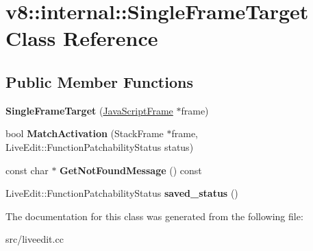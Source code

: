 \hypertarget{classv8_1_1internal_1_1_single_frame_target}{}\section{v8\+:\+:internal\+:\+:Single\+Frame\+Target Class Reference}
\label{classv8_1_1internal_1_1_single_frame_target}
\subsection*{Public Member Functions}
\begin{DoxyCompactItemize}
\item 
\hypertarget{classv8_1_1internal_1_1_single_frame_target_a00d5b78ddee5f1672be046372657766c}{}{\bfseries Single\+Frame\+Target} (\hyperlink{classv8_1_1internal_1_1_java_script_frame}{Java\+Script\+Frame} $\ast$frame)\label{classv8_1_1internal_1_1_single_frame_target_a00d5b78ddee5f1672be046372657766c}

\item 
\hypertarget{classv8_1_1internal_1_1_single_frame_target_a89565a725f8bba4c0e25500340420d90}{}bool {\bfseries Match\+Activation} (Stack\+Frame $\ast$frame, Live\+Edit\+::\+Function\+Patchability\+Status status)\label{classv8_1_1internal_1_1_single_frame_target_a89565a725f8bba4c0e25500340420d90}

\item 
\hypertarget{classv8_1_1internal_1_1_single_frame_target_affaaca2e2169b2be3d82591cebae94d8}{}const char $\ast$ {\bfseries Get\+Not\+Found\+Message} () const \label{classv8_1_1internal_1_1_single_frame_target_affaaca2e2169b2be3d82591cebae94d8}

\item 
\hypertarget{classv8_1_1internal_1_1_single_frame_target_a039a30540836036c904a371d0658b7b6}{}Live\+Edit\+::\+Function\+Patchability\+Status {\bfseries saved\+\_\+status} ()\label{classv8_1_1internal_1_1_single_frame_target_a039a30540836036c904a371d0658b7b6}

\end{DoxyCompactItemize}


The documentation for this class was generated from the following file\+:\begin{DoxyCompactItemize}
\item 
src/liveedit.\+cc\end{DoxyCompactItemize}
